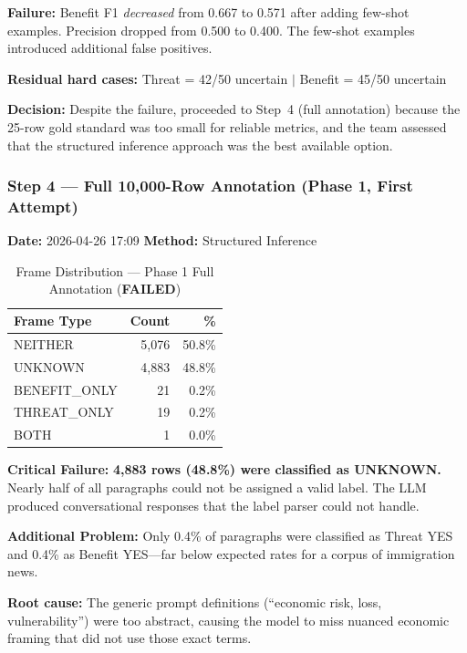 \textbf{Failure:} Benefit F1 \textit{decreased} from 0.667 to 0.571 after adding few-shot examples. Precision dropped from 0.500 to 0.400. The few-shot examples introduced additional false positives.

\textbf{Residual hard cases:} Threat = 42/50 uncertain $|$ Benefit = 45/50 uncertain

\textbf{Decision:} Despite the failure, proceeded to Step~4 (full annotation) because the 25-row gold standard was too small for reliable metrics, and the team assessed that the structured inference approach was the best available option.

\subsubsection{Step 4 --- Full 10,000-Row Annotation (Phase 1, First Attempt)}
\label{sec:step4_phase1}

\textbf{Date:} 2026-04-26 17:09 \quad \textbf{Method:} Structured Inference

\begin{table}[H]
\centering
\caption{Frame Distribution --- Phase 1 Full Annotation (\textbf{FAILED})}
\begin{tabular}{@{}lrr@{}}
\toprule
\textbf{Frame Type} & \textbf{Count} & \textbf{\%} \\
\midrule
NEITHER       & 5,076  & 50.8\% \\
\rowcolor{fail!15} UNKNOWN       & 4,883  & 48.8\% \\
BENEFIT\_ONLY & 21     & 0.2\% \\
THREAT\_ONLY  & 19     & 0.2\% \\
BOTH          & 1      & 0.0\% \\
\bottomrule
\end{tabular}
\end{table}

\textbf{Critical Failure:} \textcolor{fail}{\textbf{4,883 rows (48.8\%) were classified as UNKNOWN.}} Nearly half of all paragraphs could not be assigned a valid label. The LLM produced conversational responses that the label parser could not handle.

\textbf{Additional Problem:} Only 0.4\% of paragraphs were classified as Threat YES and 0.4\% as Benefit YES---far below expected rates for a corpus of immigration news.

\textbf{Root cause:} The generic prompt definitions (``economic risk, loss, vulnerability'') were too abstract, causing the model to miss nuanced economic framing that did not use those exact terms.

